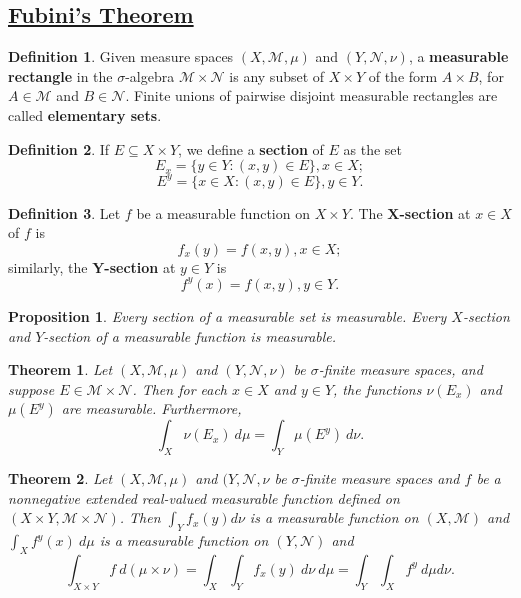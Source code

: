 \documentclass[11pt]{amsart}
\newtheorem*{theorem*}{Theorem}
\newtheorem*{proposition*}{Proposition}
\theoremstyle{definition}
\newtheorem*{definition*}{Definition}
\renewcommand\:{\colon}
\newcommand{\calM}{\mathcal{M}}
\newcommand{\calN}{\mathcal{N}}
\newcommand{\dmu}{\ d\mu}
\begin{document}
\vskip20pt



\subsection*{\underline{Fubini's Theorem}}

\begin{definition*}
	Given measure spaces $(X, \calM, \mu)$ and $(Y, \calN, \nu)$, a \textbf{measurable rectangle} in the $\sigma$-algebra $\calM \times \calN$ is any subset of $X \times Y$ of the form $A \times B$, for $A \in \calM$ and $B \in \calN$. Finite unions of pairwise disjoint measurable rectangles are called \textbf{elementary sets}.
\end{definition*}

\begin{definition*}
	If $E \subseteq X \times Y$, we define a  \textbf{section} of $E$ as the set
		\[ E_x = \{ y \in Y : (x,y) \in E\}, x \in X; \]
		\[ E^y = \{ x \in X : (x,y) \in E\}, y \in Y. \]
\end{definition*}

\begin{definition*}
	Let $f$ be a measurable function on $X \times Y$. The \textbf{$\boldsymbol{X}$-section} at $x \in X$ of $f$ is
		\[ f_x(y) = f(x,y), x \in X; \]
	similarly, the \textbf{$\boldsymbol{Y}$-section} at $y \in Y$ is 
		\[ f^y(x) = f(x,y), y \in Y. \] 
\end{definition*}

\begin{proposition*}
	Every section of a measurable set is measurable. Every $X$-section and $Y$-section of a measurable function is measurable.
\end{proposition*}

\begin{theorem*}
	Let $(X, \calM, \mu)$ and $(Y, \calN, \nu)$ be $\sigma$-finite measure spaces, and suppose $E \in \calM \times \calN$. Then for each $x \in X$ and $y \in Y$, the functions $\nu(E_x)$ and $\mu(E^y)$ are measurable. Furthermore,
		\[ \int_X \nu(E_x) \dmu = \int_Y \mu(E^y) \ d\nu. \]
\end{theorem*}

\begin{theorem*}
	Let $(X, \calM, \mu)$ and $(Y, \calN, \nu$ be $\sigma$-finite measure spaces and $f$ be a nonnegative extended real-valued measurable function defined on $(X \times Y, \calM \times \calN)$. Then $\int_Y f_x(y) d\nu$ is a measurable function on $(X, \calM)$ and $\int_X f^y(x) \dmu$ is a measurable function on $(Y, \calN)$ and
		\[ \int_{X \times Y} f \ d(\mu \times \nu) = \int_X \int_Y f_x(y) \ d\nu \dmu = \int_Y\int_X f^y \dmu d\nu. \]
\end{theorem*}
\end{document}
